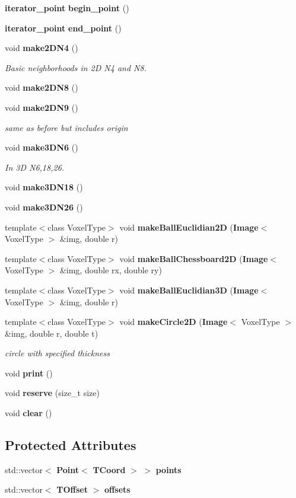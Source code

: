 \begin{CompactItemize}
\item 
{\bf iterator\_\-point} {\bf begin\_\-point} ()
\item 
{\bf iterator\_\-point} {\bf end\_\-point} ()
\item 
void {\bf make2DN4} ()
\begin{CompactList}\small\item\em Basic neighborhoods in 2D N4 and N8. \item\end{CompactList}\item 
void {\bf make2DN8} ()
\item 
void {\bf make2DN9} ()
\begin{CompactList}\small\item\em same as before but includes origin \item\end{CompactList}\item 
void {\bf make3DN6} ()
\begin{CompactList}\small\item\em In 3D N6,18,26. \item\end{CompactList}\item 
void {\bf make3DN18} ()
\item 
void {\bf make3DN26} ()
\item 
template$<$class Voxel\-Type$>$ void {\bf make\-Ball\-Euclidian2D} ({\bf Image}$<$ Voxel\-Type $>$ \&img, double r)
\item 
template$<$class Voxel\-Type$>$ void {\bf make\-Ball\-Chessboard2D} ({\bf Image}$<$ Voxel\-Type $>$ \&img, double rx, double ry)
\item 
template$<$class Voxel\-Type$>$ void {\bf make\-Ball\-Euclidian3D} ({\bf Image}$<$ Voxel\-Type $>$ \&img, double r)
\item 
template$<$class Voxel\-Type$>$ void {\bf make\-Circle2D} ({\bf Image}$<$ Voxel\-Type $>$ \&img, double r, double t)
\begin{CompactList}\small\item\em circle with specified thickness \item\end{CompactList}\item 
void {\bf print} ()
\item 
void {\bf reserve} (size\_\-t size)
\item 
void {\bf clear} ()
\end{CompactItemize}
\subsection*{Protected Attributes}
\begin{CompactItemize}
\item 
std::vector$<$ {\bf Point}$<$ {\bf TCoord} $>$ $>$ {\bf points}
\item 
std::vector$<$ {\bf TOffset} $>$ {\bf offsets}
\end{CompactItemize}


